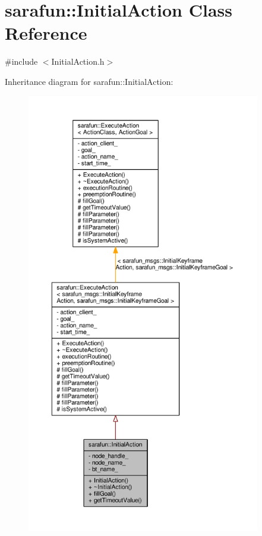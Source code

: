 \hypertarget{classsarafun_1_1InitialAction}{\section{sarafun\-:\-:Initial\-Action Class Reference}
\label{classsarafun_1_1InitialAction}
}


{\ttfamily \#include $<$Initial\-Action.\-h$>$}



Inheritance diagram for sarafun\-:\-:Initial\-Action\-:
\nopagebreak
\begin{figure}[H]
\begin{center}
\leavevmode
\includegraphics[height=550pt]{d2/dd7/classsarafun_1_1InitialAction__inherit__graph}
\end{center}
\end{figure}


